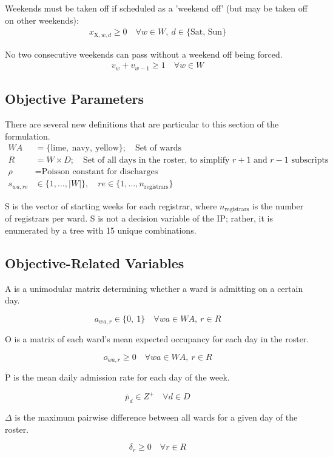 \documentclass[a4paper]{article}
\begin{document}
Weekends must be taken off if scheduled as a 'weekend off' (but may be taken off on other weekends):
\begin{align}
  x_{\text{X}, w, d} \ge 0 \quad\forall w\in W,\ d\in \{\text{Sat, Sun}\}
\end{align}

No two consecutive weekends can pass without a weekend off being forced.
\begin{align}
  v_w + v_{w-1} \ge 1 \quad\forall w\in W
\end{align}

\subsection{Objective Parameters}

There are several new definitions that are particular to this section of the formulation.
\begin{align*}
  WA &= \{\text{lime},\ \text{navy},\ \text{yellow}\};\quad\text{Set of wards}\\
  R &= W\times D;\quad\text{Set of all days in the roster, to simplify $r+1$ and $r-1$ subscripts}\\
  \rho &= \text{Poisson constant for discharges}\\
  s_{wa,re} &\in \{1,\dots,|W|\}, \quad re \in \{1,\dots,n_\text{registrars}\}
\end{align*}

S is the vector of starting weeks for each registrar, where $n_\text{registrars}$ is the number of registrars per ward. S is not a decision variable of the IP; rather, it is enumerated by a tree with 15 unique combinations.

\subsection{Objective-Related Variables}

\begin{multicols}{2}

A is a unimodular matrix determining whether a ward is admitting on a certain day.

$$a_{wa, r} \in \{0,\ 1\} \quad\forall wa\in WA,\ r\in R$$

O is a matrix of each ward's mean expected occupancy for each day in the roster.

$$o_{wa, r} \ge 0 \quad\forall wa\in WA,\ r\in R$$

$\dot{\text{P}}$ is the mean daily admission rate for each day of the week.

$$\dot{p_{d}} \in Z^+ \quad\forall d\in D$$

$\Delta$ is the maximum pairwise difference between all wards for a given day of the roster.

$$\delta_r \ge 0 \quad\forall r \in R$$

\end{multicols}
\end{document}
